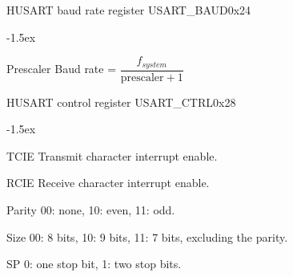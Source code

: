 \documentclass[12pt]{article}
\begin{document}
\begin{register}{H}{USART baud rate register USART\_BAUD}{0x24}
\label{usartbaud}
%
%
\regnewline%
\end{register}
\begin{regdesc}[0.6\textwidth]\begin{reglist}[000000000]
\itemsep-1.5ex
\item[Prescaler] Baud rate = $\dfrac{f_{system}}{\textrm{prescaler}+1}$
\end{reglist}\end{regdesc}

\begin{register}{H}{USART control register USART\_CTRL}{0x28}
\label{usartctrl}
%
%
%
%
%
%
\regnewline%
\end{register}
\begin{regdesc}[0.6\textwidth]\begin{reglist}[00000]
\itemsep-1.5ex
\item[TCIE] Transmit character interrupt enable.
\item[RCIE] Receive character interrupt enable.
\item[Parity] 00: none, 10: even, 11: odd.
\item[Size] 00: 8 bits, 10: 9 bits, 11: 7 bits, excluding the parity.
\item[SP] 0: one stop bit, 1: two stop bits.
\end{reglist}\end{regdesc}
\end{document}
